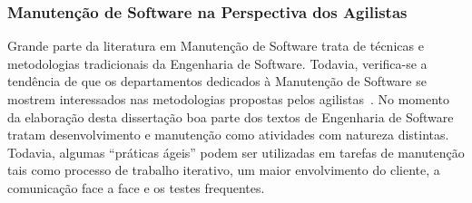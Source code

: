 

\subsubsection{Manutenção de Software na Perspectiva dos Agilistas}\label{sub:manutenção_de_software_com_método_dos_agilistas}

Grande parte da literatura em Manutenção de Software trata de técnicas e
metodologias tradicionais da Engenharia de Software. Todavia, verifica-se a
tendência de que os departamentos dedicados à Manutenção de Software se mostrem
interessados nas metodologias propostas pelos agilistas~\cite{Heeager2015}.  No
momento da elaboração desta dissertação boa parte dos textos de Engenharia de
Software tratam desenvolvimento e manutenção como atividades com natureza
distintas. Todavia, algumas ``práticas ágeis'' podem ser utilizadas em tarefas
de manutenção tais como processo de trabalho iterativo, um maior envolvimento
do cliente, a comunicação face a face e os testes frequentes.

